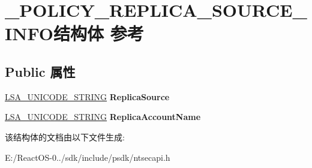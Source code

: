 \hypertarget{struct___p_o_l_i_c_y___r_e_p_l_i_c_a___s_o_u_r_c_e___i_n_f_o}{}\section{\+\_\+\+P\+O\+L\+I\+C\+Y\+\_\+\+R\+E\+P\+L\+I\+C\+A\+\_\+\+S\+O\+U\+R\+C\+E\+\_\+\+I\+N\+F\+O结构体 参考}
\label{struct___p_o_l_i_c_y___r_e_p_l_i_c_a___s_o_u_r_c_e___i_n_f_o}
\subsection*{Public 属性}
\begin{DoxyCompactItemize}
\item 
\mbox{\label{struct___p_o_l_i_c_y___r_e_p_l_i_c_a___s_o_u_r_c_e___i_n_f_o_a5964dc63f3deddfd05e27be7951c5e17}} 
\hyperlink{struct___l_s_a___u_n_i_c_o_d_e___s_t_r_i_n_g}{L\+S\+A\+\_\+\+U\+N\+I\+C\+O\+D\+E\+\_\+\+S\+T\+R\+I\+NG} {\bfseries Replica\+Source}
\item 
\mbox{\label{struct___p_o_l_i_c_y___r_e_p_l_i_c_a___s_o_u_r_c_e___i_n_f_o_a074aae318159bf93bfa3d4d3e2fa3b09}} 
\hyperlink{struct___l_s_a___u_n_i_c_o_d_e___s_t_r_i_n_g}{L\+S\+A\+\_\+\+U\+N\+I\+C\+O\+D\+E\+\_\+\+S\+T\+R\+I\+NG} {\bfseries Replica\+Account\+Name}
\end{DoxyCompactItemize}


该结构体的文档由以下文件生成\+:\begin{DoxyCompactItemize}
\item 
E\+:/\+React\+O\+S-\/0../sdk/include/psdk/ntsecapi.\+h\end{DoxyCompactItemize}
